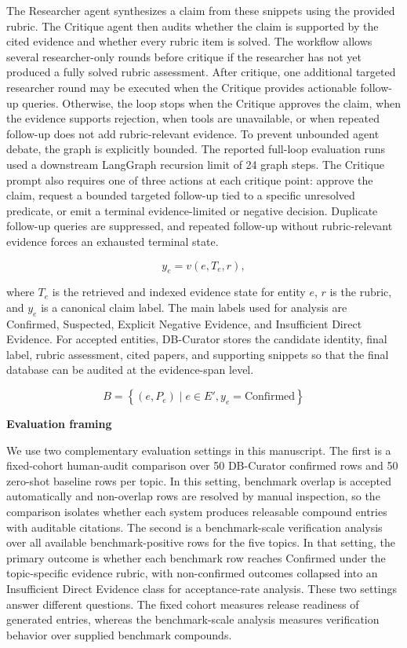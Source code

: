 \documentclass[
]{article}
\begin{document}
The Researcher agent synthesizes a claim from these snippets using the
provided rubric. The Critique agent then audits whether the claim is
supported by the cited evidence and whether every rubric item is solved.
The workflow allows several researcher-only rounds before critique if
the researcher has not yet produced a fully solved rubric assessment.
After critique, one additional targeted researcher round may be executed
when the Critique provides actionable follow-up queries. Otherwise, the
loop stops when the Critique approves the claim, when the evidence
supports rejection, when tools are unavailable, or when repeated
follow-up does not add rubric-relevant evidence.
To prevent unbounded agent debate, the graph is explicitly bounded. The
reported full-loop evaluation runs used a downstream LangGraph recursion
limit of 24 graph steps. The Critique prompt also requires one of three
actions at each critique point: approve the claim, request a bounded
targeted follow-up tied to a specific unresolved predicate, or emit a
terminal evidence-limited or negative decision. Duplicate follow-up
queries are suppressed, and repeated follow-up without rubric-relevant
evidence forces an exhausted terminal state.

\[y_e = v(e,T_e,r),\]

where \(T_e\) is the retrieved and indexed evidence state for entity
\(e\), \(r\) is the rubric, and \(y_e\) is a canonical claim label. The
main labels used for analysis are Confirmed, Suspected, Explicit
Negative Evidence, and Insufficient Direct Evidence. For accepted
entities, DB-Curator stores the candidate identity, final label, rubric
assessment, cited papers, and supporting snippets so that the final
database can be audited at the evidence-span level.

\[B = \left\{ \left( e,P_{e} \right) \mid e \in E', y_{e} = \text{Confirmed} \right\}\]

\textbf{Evaluation framing}

We use two complementary evaluation settings in this manuscript. The
first is a fixed-cohort human-audit comparison over 50 DB-Curator
confirmed rows and 50 zero-shot baseline rows per topic. In this setting,
benchmark overlap is accepted automatically and non-overlap rows are
resolved by manual inspection, so the comparison isolates whether each
system produces releasable compound entries with auditable citations.
The second is a benchmark-scale verification analysis over all available
benchmark-positive rows for the five topics. In that setting, the
primary outcome is whether each benchmark row reaches Confirmed under
the topic-specific evidence rubric, with non-confirmed outcomes
collapsed into an Insufficient Direct Evidence class for acceptance-rate
analysis. These two settings answer different questions. The fixed
cohort measures release readiness of generated entries, whereas the
benchmark-scale analysis measures verification behavior over supplied
benchmark compounds.
\end{document}
